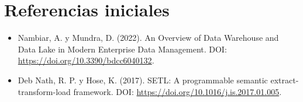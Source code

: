 \documentclass[12pt,a4paper]{article}
\begin{document}
\section{Referencias iniciales}
\begin{itemize}
\item Nambiar, A. y Mundra, D. (2022). An Overview of Data Warehouse and Data Lake in Modern Enterprise Data Management. DOI: \url{https://doi.org/10.3390/bdcc6040132}.
\item Deb Nath, R. P. y Hose, K. (2017). SETL: A programmable semantic extract-transform-load framework. DOI: \url{https://doi.org/10.1016/j.is.2017.01.005}.
\end{itemize}
\end{document}
